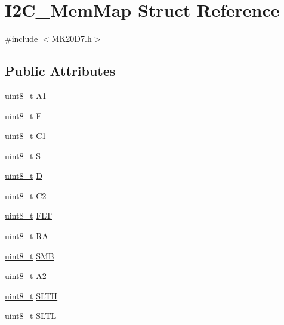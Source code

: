 \hypertarget{struct_i2_c___mem_map}{}\section{I2\+C\+\_\+\+Mem\+Map Struct Reference}
\label{struct_i2_c___mem_map}


{\ttfamily \#include $<$M\+K20\+D7.\+h$>$}

\subsection*{Public Attributes}
\begin{DoxyCompactItemize}
\item 
\hyperlink{_p_e___types_8h_aba7bc1797add20fe3efdf37ced1182c5}{uint8\+\_\+t} \hyperlink{struct_i2_c___mem_map_aefc602e5555ff9807f66ba8d67c214c0}{A1}
\item 
\hyperlink{_p_e___types_8h_aba7bc1797add20fe3efdf37ced1182c5}{uint8\+\_\+t} \hyperlink{struct_i2_c___mem_map_a9f07a2e505dda38873798958a6c9f432}{F}
\item 
\hyperlink{_p_e___types_8h_aba7bc1797add20fe3efdf37ced1182c5}{uint8\+\_\+t} \hyperlink{struct_i2_c___mem_map_a211af10ff66759da8bd2712f3d26ad8a}{C1}
\item 
\hyperlink{_p_e___types_8h_aba7bc1797add20fe3efdf37ced1182c5}{uint8\+\_\+t} \hyperlink{struct_i2_c___mem_map_acba6223219d3887b1ba085cf199bf84a}{S}
\item 
\hyperlink{_p_e___types_8h_aba7bc1797add20fe3efdf37ced1182c5}{uint8\+\_\+t} \hyperlink{struct_i2_c___mem_map_a44f0a2e82a172b16e1241939185790cf}{D}
\item 
\hyperlink{_p_e___types_8h_aba7bc1797add20fe3efdf37ced1182c5}{uint8\+\_\+t} \hyperlink{struct_i2_c___mem_map_a5e8189de70defa55b4d4d50e42ac88d1}{C2}
\item 
\hyperlink{_p_e___types_8h_aba7bc1797add20fe3efdf37ced1182c5}{uint8\+\_\+t} \hyperlink{struct_i2_c___mem_map_a6520708827670dc2938e6cdec0264763}{F\+LT}
\item 
\hyperlink{_p_e___types_8h_aba7bc1797add20fe3efdf37ced1182c5}{uint8\+\_\+t} \hyperlink{struct_i2_c___mem_map_a9f17398ec3278c30924dd797dea9788a}{RA}
\item 
\hyperlink{_p_e___types_8h_aba7bc1797add20fe3efdf37ced1182c5}{uint8\+\_\+t} \hyperlink{struct_i2_c___mem_map_a14ca29af4960a6588080acb71f62d5fa}{S\+MB}
\item 
\hyperlink{_p_e___types_8h_aba7bc1797add20fe3efdf37ced1182c5}{uint8\+\_\+t} \hyperlink{struct_i2_c___mem_map_ad4e4dbcd884a2b52af7dbef17817f12e}{A2}
\item 
\hyperlink{_p_e___types_8h_aba7bc1797add20fe3efdf37ced1182c5}{uint8\+\_\+t} \hyperlink{struct_i2_c___mem_map_aac56d4be80ad622d7bf85bdd8c29504c}{S\+L\+TH}
\item 
\hyperlink{_p_e___types_8h_aba7bc1797add20fe3efdf37ced1182c5}{uint8\+\_\+t} \hyperlink{struct_i2_c___mem_map_afd5aa3cef3245893addeb55556e1ceff}{S\+L\+TL}
\end{DoxyCompactItemize}


